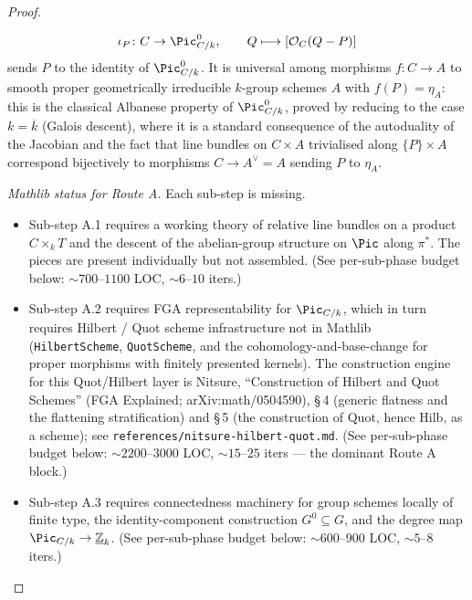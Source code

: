 \begin{proof}
\begin{itemize}
    \[
      \iota_P \colon C \to \Pic^0_{C/k}, \qquad
      Q \longmapsto [\mathcal O_C(Q - P)]
    \]
    sends \(P\) to the identity of \(\Pic^0_{C/k}\). It is universal among morphisms \(f \colon C \to A\) to smooth proper geometrically irreducible \(k\)-group schemes \(A\) with \(f(P) = \eta_A\): this is the classical Albanese property of \(\Pic^0_{C/k}\), proved by reducing to the case \(k = \overline k\) (Galois descent), where it is a standard consequence of the autoduality of the Jacobian and the fact that line bundles on \(C \times A\) trivialised along \(\{P\} \times A\) correspond bijectively to morphisms \(C \to A^{\vee} = A\) sending \(P\) to \(\eta_A\).
  \end{itemize}
  \emph{Mathlib status for Route A.} Each sub-step is missing.
  \begin{itemize}
    \item Sub-step A.1 requires a working theory of relative line bundles on a product \(C \times_k T\) and the descent of the abelian-group structure on \(\Pic\) along \(\pi^*\). The pieces are present individually but not assembled. (See per-sub-phase budget below: \(\sim 700\)--\(1100\) LOC, \(\sim 6\)--\(10\) iters.)
    \item Sub-step A.2 requires FGA representability for \(\Pic_{C/k}\), which in turn requires Hilbert / Quot scheme infrastructure not in Mathlib (\texttt{HilbertScheme}, \texttt{QuotScheme}, and the cohomology-and-base-change for proper morphisms with finitely presented kernels). The construction engine for this Quot/Hilbert layer is Nitsure, ``Construction of Hilbert and Quot Schemes'' (FGA Explained; arXiv:math/0504590), \S\,4 (generic flatness and the flattening stratification) and \S\,5 (the construction of \(\mathrm{Quot}\), hence \(\mathrm{Hilb}\), as a scheme); see \texttt{references/nitsure-hilbert-quot.md}. (See per-sub-phase budget below: \(\sim 2200\)--\(3000\) LOC, \(\sim 15\)--\(25\) iters --- the dominant Route A block.)
    \item Sub-step A.3 requires connectedness machinery for group schemes locally of finite type, the identity-component construction \(G^0 \subseteq G\), and the degree map \(\Pic_{C/k} \to \underline{\mathbb Z}_k\). (See per-sub-phase budget below: \(\sim 600\)--\(900\) LOC, \(\sim 5\)--\(8\) iters.)

\end{itemize}
\end{proof}
